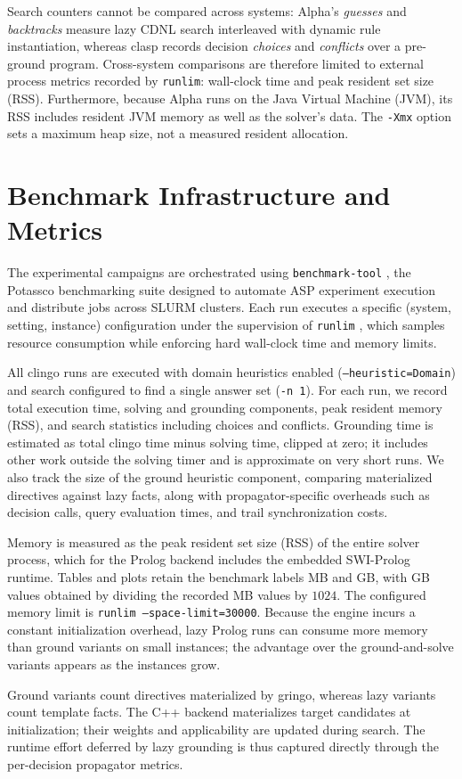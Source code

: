 Search counters cannot be compared across systems: Alpha's \emph{guesses} and \emph{backtracks} measure lazy CDNL search interleaved with dynamic rule instantiation, whereas clasp records decision \emph{choices} and \emph{conflicts} over a pre-ground program. Cross-system comparisons are therefore limited to external process metrics recorded by \texttt{runlim}: wall-clock time and peak resident set size (RSS). Furthermore, because Alpha runs on the Java Virtual Machine (JVM), its RSS includes resident JVM memory as well as the solver's data. The \texttt{-Xmx} option sets a maximum heap size, not a measured resident allocation.

\section{Benchmark Infrastructure and Metrics}
\label{sec:infra-metrics}

The experimental campaigns are orchestrated using \texttt{benchmark-tool} \cite{benchmarkTool}, the Potassco benchmarking suite designed to automate ASP experiment execution and distribute jobs across SLURM clusters. Each run executes a specific (system, setting, instance) configuration under the supervision of \texttt{runlim} \cite{runlim}, which samples resource consumption while enforcing hard wall-clock time and memory limits.

All clingo runs are executed with domain heuristics enabled (\texttt{--heuristic=\allowbreak Domain}) and search configured to find a single answer set (\texttt{-n 1}). For each run, we record total execution time, solving and grounding components, peak resident memory (RSS), and search statistics including choices and conflicts. Grounding time is estimated as total clingo time minus solving time, clipped at zero; it includes other work outside the solving timer and is approximate on very short runs. We also track the size of the ground heuristic component, comparing materialized directives against lazy facts, along with propagator-specific overheads such as decision calls, query evaluation times, and trail synchronization costs.

Memory is measured as the peak resident set size (RSS) of the entire solver process, which for the Prolog backend includes the embedded SWI-Prolog runtime. Tables and plots retain the benchmark labels MB and GB, with GB values obtained by dividing the recorded MB values by $1024$. The configured memory limit is \texttt{runlim --space-limit=30000}. Because the engine incurs a constant initialization overhead, lazy Prolog runs can consume more memory than ground variants on small instances; the advantage over the ground-and-solve variants appears as the instances grow.

Ground variants count directives materialized by gringo, whereas lazy variants count template facts. The C++ backend materializes target candidates at initialization; their weights and applicability are updated during search. The runtime effort deferred by lazy grounding is thus captured directly through the per-decision propagator metrics.
